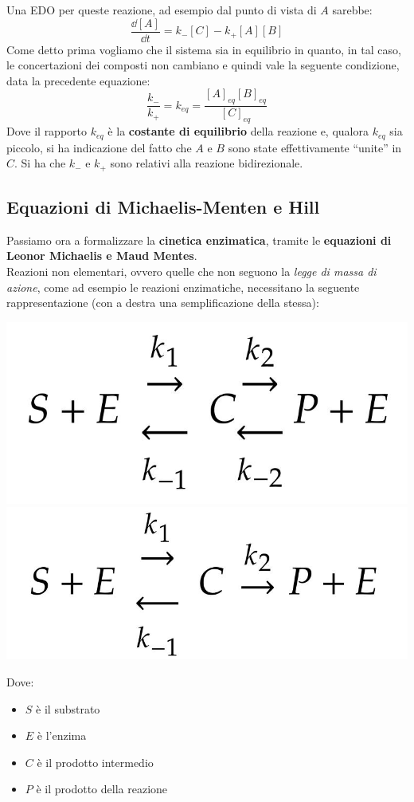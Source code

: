\documentclass[a4paper,12pt, oneside]{book}
\begin{document}
Una EDO per queste reazione, ad esempio dal punto di vista di $A$ sarebbe:
\[\frac{\dd{[A]}}{\dd{t}}=k_-[C]-k_+[A][B]\]
Come detto prima vogliamo che il sistema sia in equilibrio in quanto, in tal
caso, le concertazioni dei composti non cambiano e quindi vale la seguente
condizione, data la precedente equazione:
\[\frac{k_-}{k_+}=k_{eq}=\frac{[A]_{eq}[B]_{eq}}{[C]_{eq}}\]
Dove il rapporto $k_{eq}$ è la \textbf{costante di equilibrio} della reazione e,
qualora $k_{eq}$ sia piccolo, si ha indicazione del fatto che $A$ e $B$ sono
state effettivamente ``unite'' in $C$. Si ha che $k_-$ e $k_+$ sono relativi
alla reazione bidirezionale.
\subsection{Equazioni di Michaelis-Menten e Hill}
Passiamo ora a formalizzare la \textbf{cinetica enzimatica}, tramite le
\textbf{equazioni di Leonor Michaelis e Maud Mentes}.\\
Reazioni non elementari, ovvero quelle che non seguono la \textit{legge di massa
di azione}, come ad esempio le reazioni enzimatiche, necessitano la seguente
rappresentazione (con a destra una semplificazione della stessa):
\begin{center}
  \includegraphics[scale = 0.13]{img/equ2.jpg}
  \qquad
  \includegraphics[scale = 0.13]{img/equ3.jpg}
\end{center}
Dove:
\begin{itemize}
  \item $S$ è il substrato
  \item $E$ è l'enzima
  \item $C$ è il prodotto intermedio
  \item $P$ è il prodotto della reazione
\end{itemize}
\end{document}
